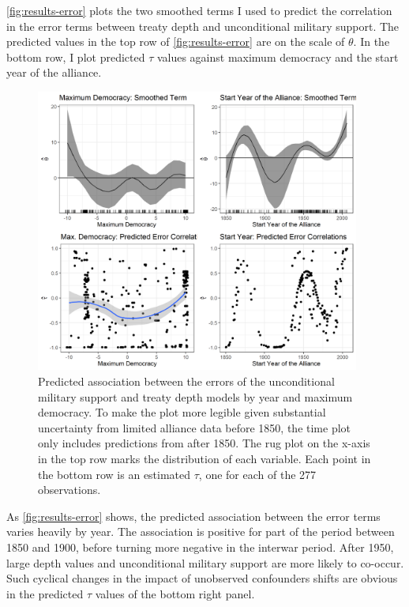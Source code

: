 \documentclass[12pt]{article}
\begin{document}
\autoref{fig:results-error} plots the two smoothed terms I used to predict the correlation in the error terms between treaty depth and unconditional military support. 
The predicted values in the top row of \autoref{fig:results-error} are on the scale of $\theta$. 
In the bottom row, I plot predicted $\tau$ values against maximum democracy and the start year of the alliance. 


\begin{figure}[hbtp]
\centering
\includegraphics[width=0.95\textwidth]{../figures/results-error.png}
\caption{Predicted association between the errors of the unconditional military support and treaty depth models by year and maximum democracy. To make the plot more legible given substantial uncertainty from limited alliance data before 1850, the time plot only includes predictions from after 1850. The rug plot on the x-axis in the top row marks the distribution of each variable. Each point in the bottom row is an estimated $\tau$, one for each of the 277 observations.}
\label{fig:results-error}
\end{figure}

As \autoref{fig:results-error} shows, the predicted association between the error terms varies heavily by year. 
The association is positive for part of the period between 1850 and 1900, before turning more negative in the interwar period. 
After 1950, large depth values and unconditional military support are more likely to co-occur. 
Such cyclical changes in the impact of unobserved confounders shifts are obvious in the predicted $\tau$ values of the bottom right panel. 
\end{document}
